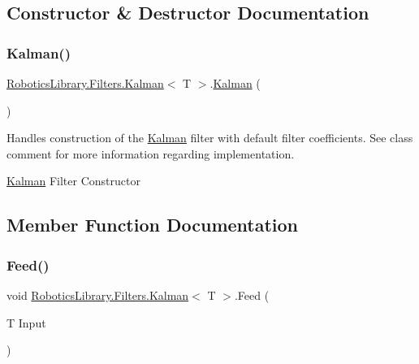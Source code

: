 \subsection{Constructor \& Destructor Documentation}
\mbox{\label{class_robotics_library_1_1_filters_1_1_kalman_a4c97ac8d96d0ce247be5331d549ff8df}} 
\subsubsection{\texorpdfstring{Kalman()}{Kalman()}}
{\footnotesize\ttfamily \hyperlink{class_robotics_library_1_1_filters_1_1_kalman}{Robotics\+Library.\+Filters.\+Kalman}$<$ T $>$.\hyperlink{class_robotics_library_1_1_filters_1_1_kalman}{Kalman} (\begin{DoxyParamCaption}{ }\end{DoxyParamCaption})}



Handles construction of the \hyperlink{class_robotics_library_1_1_filters_1_1_kalman}{Kalman} filter with default filter coefficients. See class comment for more information regarding implementation.

\hyperlink{class_robotics_library_1_1_filters_1_1_kalman}{Kalman} Filter Constructor 

\subsection{Member Function Documentation}
\mbox{\label{class_robotics_library_1_1_filters_1_1_kalman_a92a029a73d197e692fc35b1f6e0ba238}} 
\subsubsection{\texorpdfstring{Feed()}{Feed()}\hspace{0.1cm}{\footnotesize\ttfamily [1/2]}}
{\footnotesize\ttfamily void \hyperlink{class_robotics_library_1_1_filters_1_1_kalman}{Robotics\+Library.\+Filters.\+Kalman}$<$ T $>$.Feed (\begin{DoxyParamCaption}\item[{T}]{Input }\end{DoxyParamCaption})}



